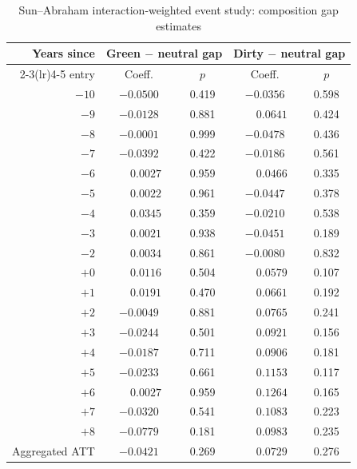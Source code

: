 \begin{table}[htbp]
\centering
\footnotesize
\caption{Sun--Abraham interaction-weighted event study: composition gap estimates}
\label{tab:sunab}
\begin{threeparttable}
\begin{tabular}{rcccc}
\toprule
Years since & \multicolumn{2}{c}{Green $-$ neutral gap} & \multicolumn{2}{c}{Dirty $-$ neutral gap} \\
\cmidrule(lr){2-3}\cmidrule(lr){4-5}
entry & Coeff. & $p$ & Coeff. & $p$ \\
\midrule
$-10$ & $-0.0500$ & 0.419 & $-0.0356$ & 0.598 \\
$-9$  & $-0.0128$ & 0.881 & $\phantom{-}0.0641$  & 0.424 \\
$-8$  & $-0.0001$ & 0.999 & $-0.0478$ & 0.436 \\
$-7$  & $-0.0392$ & 0.422 & $-0.0186$ & 0.561 \\
$-6$  & $\phantom{-}0.0027$  & 0.959 & $\phantom{-}0.0466$  & 0.335 \\
$-5$  & $\phantom{-}0.0022$  & 0.961 & $-0.0447$ & 0.378 \\
$-4$  & $\phantom{-}0.0345$  & 0.359 & $-0.0210$ & 0.538 \\
$-3$  & $\phantom{-}0.0021$  & 0.938 & $-0.0451$ & 0.189 \\
$-2$  & $\phantom{-}0.0034$  & 0.861 & $-0.0080$ & 0.832 \\
$+0$  & $\phantom{-}0.0116$  & 0.504 & $\phantom{-}0.0579$  & 0.107 \\
$+1$  & $\phantom{-}0.0191$  & 0.470 & $\phantom{-}0.0661$  & 0.192 \\
$+2$  & $-0.0049$ & 0.881 & $\phantom{-}0.0765$  & 0.241 \\
$+3$  & $-0.0244$ & 0.501 & $\phantom{-}0.0921$  & 0.156 \\
$+4$  & $-0.0187$ & 0.711 & $\phantom{-}0.0906$  & 0.181 \\
$+5$  & $-0.0233$ & 0.661 & $\phantom{-}0.1153$  & 0.117 \\
$+6$  & $\phantom{-}0.0027$  & 0.959 & $\phantom{-}0.1264$  & 0.165 \\
$+7$  & $-0.0320$ & 0.541 & $\phantom{-}0.1083$  & 0.223 \\
$+8$  & $-0.0779$ & 0.181 & $\phantom{-}0.0983$  & 0.235 \\
\midrule
Aggregated ATT & $-0.0421$ & 0.269 & $\phantom{-}0.0729$ & 0.276 \\
\bottomrule
\end{tabular}
\begin{tablenotes}[flushleft]\footnotesize

\end{tablenotes}
\end{threeparttable}
\end{table}
